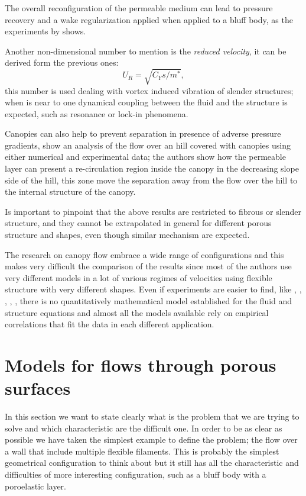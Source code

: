 The overall reconfiguration of the permeable medium can lead to pressure recovery and a wake regularization applied when applied to a bluff body, as the experiments by \citet{gosselin2011drag} shows.

Another non-dimensional number to mention is the \textit{reduced velocity}, it can be derived form the previous ones:
$$ U_R = \sqrt{C_Y s / m^*},$$
this number is used dealing with vortex induced vibration of slender structures; when is near to one dynamical coupling between the fluid and the structure is expected, such as resonance or lock-in phenomena.

Canopies can also help to prevent separation in presence of adverse pressure gradients, \citet{belcher2012wind} show an analysis of the flow over an hill covered with canopies using either numerical and experimental data; the authors show how the permeable layer can present a re-circulation region inside the canopy in the decreasing slope side of the hill, this zone move the separation away from the flow over the hill to the internal structure of the canopy.

Is important to pinpoint that the above results are restricted to fibrous or slender structure, and they cannot be extrapolated in general for different porous structure and shapes, even though similar mechanism are expected.

The research on canopy flow embrace a wide range of configurations and this makes very difficult the comparison of the results since most of the authors use very different models in a lot of various regimes of velocities using flexible structure with very different shapes.
Even if experiments are easier to find, like \citet{segalini2011experimental}, \citet{segalini2013scaling}, \citet{maza2013coupled}, \citet{barsu2016drag}, \citet{alvarado2017nature}, there is no quantitatively mathematical model established for the fluid and structure equations and almost all the models available rely on empirical correlations that fit the data in each different application.


\section{Models for flows through porous surfaces}

In this section we want to state clearly what is the problem that we are trying to solve and which characteristic are the difficult one.
In order to be as clear as possible we have taken the simplest example to define the problem; the flow over a wall that include multiple flexible filaments. 
This is probably the simplest geometrical configuration to think about but it still has all the characteristic and difficulties of more interesting configuration, such as a bluff body with a poroelastic layer.

